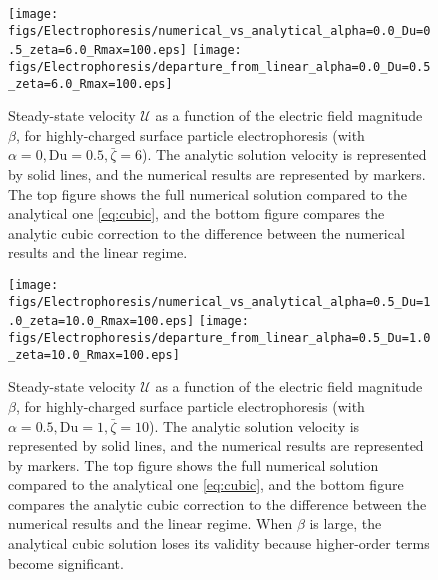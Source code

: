 \documentclass[MSc,beforeExam]{iitcsthesis}
\newcommand\cU{\mathscr{U}}
\begin{document}
\begin{figure}
    \begin{center}
    \texttt{[image: figs/Electrophoresis/numerical\_vs\_analytical\_alpha=0.0\_Du=0.5\_zeta=6.0\_Rmax=100.eps]}
    \texttt{[image: figs/Electrophoresis/departure\_from\_linear\_alpha=0.0\_Du=0.5\_zeta=6.0\_Rmax=100.eps]}
        \caption[Highly-charged surface particle steady-state velocity]{
        Steady-state velocity $\cU$ as a function of the 
        electric field magnitude $\beta$, for highly-charged surface particle
        electrophoresis (with $\alpha = 0, \text{Du} = 0.5, \bar\zeta = 6$).
        The analytic solution velocity is represented by solid lines, 
        and the numerical results are represented by markers.
        The top figure shows the full numerical solution 
        compared to the analytical one \eqref{eq:cubic}, and
        the bottom figure compares the analytic cubic correction \cite{schnitzer2012cubic} 
        to the difference between the numerical results and the linear regime.}
	    \label{fig:Electrophoresis1}
    \end{center}
\end{figure}

\begin{figure}
    \begin{center}
    \texttt{[image: figs/Electrophoresis/numerical\_vs\_analytical\_alpha=0.5\_Du=1.0\_zeta=10.0\_Rmax=100.eps]}
    \texttt{[image: figs/Electrophoresis/departure\_from\_linear\_alpha=0.5\_Du=1.0\_zeta=10.0\_Rmax=100.eps]}
        \caption[Highly-charged surface particle steady-state velocity]{
        Steady-state velocity $\cU$ as a function of the 
        electric field magnitude $\beta$, for highly-charged surface particle
        electrophoresis (with $\alpha = 0.5, \text{Du} = 1, \bar\zeta = 10$).
        The analytic solution velocity is represented by solid lines, 
        and the numerical results are represented by markers.
        The top figure shows the full numerical solution 
        compared to the analytical one \eqref{eq:cubic}, and
        the bottom figure compares the analytic cubic correction \cite{schnitzer2012cubic} 
        to the difference between the numerical results and the linear regime.
        When $\beta$ is large, the analytical cubic solution loses its validity 
        because higher-order terms become significant.}
	    \label{fig:Electrophoresis2}
    \end{center}
\end{figure}
\end{document}
